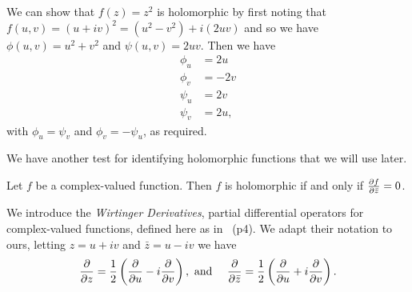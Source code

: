     \begin{ex}
      We can show that $f(z) = z^2$ is holomorphic by first noting that $f(u, v) = (u + iv)^2 = (u^2 - v^2) + i(2uv)$ and so we have $\phi(u, v) = u^2 + v^2$ and $\psi(u, v) = 2uv$. Then we have
      \begin{align*}
        \phi_u &= 2u\\
        \phi_v &= -2v\\
        \psi_u &= 2v\\
        \psi_v &= 2u,
      \end{align*}
      with $\phi_u = \psi_v$ and $\phi_v = -\psi_u$, as required.
    \end{ex}

    We have another test for identifying holomorphic functions that we will use later.

    \begin{lem}
      \label{lem:dfdzbar}
      Let $f$ be a complex-valued function. Then $f$ is holomorphic if and only if $\frac{\partial f}{\partial \bar{z}} = 0$.
    \end{lem}
      

    We introduce the \emph{Wirtinger Derivatives}, partial differential operators for complex-valued functions, defined here as in~\cite{GR65} (p4). We adapt their notation to ours, letting $z = u + iv$ and $\bar{z} = u - iv$ we have
    \[
      \begin{array}{cc}
        \displaystyle\frac{\partial}{\partial z} = \frac{1}{2}\left(\frac{\partial}{\partial u} - i\frac{\partial}{\partial v}\right), \text{ and } & \displaystyle\frac{\partial}{\partial \bar{z}} = \frac{1}{2}\left(\frac{\partial}{\partial u} + i\frac{\partial}{\partial v}\right).
      \end{array}
    \]

